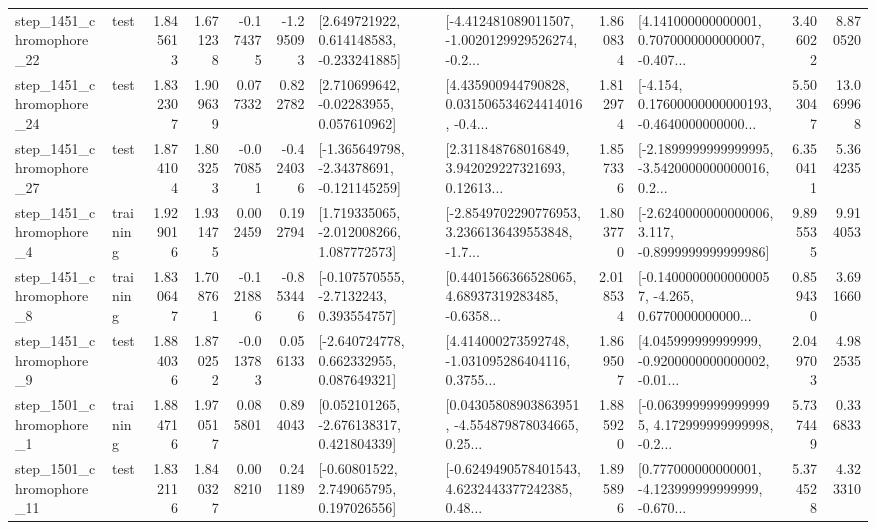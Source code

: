 \begin{tabular}{llrrrrllrlrr}
 step\_1451\_chromophore\_22 &      test &      1.845613 &    1.671238 &     -0.174375 & -1.295093 &    [2.649721922, 0.614148583, -0.233241885] &  [-4.412481089011507, -1.0020129929526274, -0.2... &       1.860834 &  [4.141000000000001, 0.7070000000000007, -0.407... &            3.406022 &          8.870520 \\
 step\_1451\_chromophore\_24 &      test &      1.832307 &    1.909639 &      0.077332 &  0.822782 &     [2.710699642, -0.02283955, 0.057610962] &  [4.435900944790828, 0.031506534624414016, -0.4... &       1.812974 &  [-4.154, 0.17600000000000193, -0.4640000000000... &            5.503047 &         13.069968 \\
 step\_1451\_chromophore\_27 &      test &      1.874104 &    1.803253 &     -0.070851 & -0.424036 &   [-1.365649798, -2.34378691, -0.121145259] &  [2.311848768016849, 3.942029227321693, 0.12613... &       1.857336 &  [-2.1899999999999995, -3.5420000000000016, 0.2... &            6.350411 &          5.364235 \\
  step\_1451\_chromophore\_4 &  training &      1.929016 &    1.931475 &      0.002459 &  0.192794 &    [1.719335065, -2.012008266, 1.087772573] &  [-2.8549702290776953, 3.2366136439553848, -1.7... &       1.803770 &  [-2.6240000000000006, 3.117, -0.8999999999999986] &            9.895535 &          9.914053 \\
  step\_1451\_chromophore\_8 &  training &      1.830647 &    1.708761 &     -0.121886 & -0.853446 &     [-0.107570555, -2.7132243, 0.393554757] &  [0.4401566366528065, 4.68937319283485, -0.6358... &       2.018534 &  [-0.14000000000000057, -4.265, 0.6770000000000... &            0.859430 &          3.691660 \\
  step\_1451\_chromophore\_9 &      test &      1.884036 &    1.870252 &     -0.013783 &  0.056133 &    [-2.640724778, 0.662332955, 0.087649321] &  [4.414000273592748, -1.031095286404116, 0.3755... &       1.869507 &  [4.045999999999999, -0.9200000000000002, -0.01... &            2.049703 &          4.982535 \\
  step\_1501\_chromophore\_1 &  training &      1.884716 &    1.970517 &      0.085801 &  0.894043 &    [0.052101265, -2.676138317, 0.421804339] &  [0.04305808903863951, -4.554879878034665, 0.25... &       1.885920 &  [-0.06399999999999995, 4.172999999999998, -0.2... &            5.737449 &          0.336833 \\
 step\_1501\_chromophore\_11 &      test &      1.832116 &    1.840327 &      0.008210 &  0.241189 &     [-0.60801522, 2.749065795, 0.197026556] &  [-0.6249490578401543, 4.6232443377242385, 0.48... &       1.895896 &  [0.777000000000001, -4.123999999999999, -0.670... &            5.374528 &          4.323310 \\

\end{tabular}

